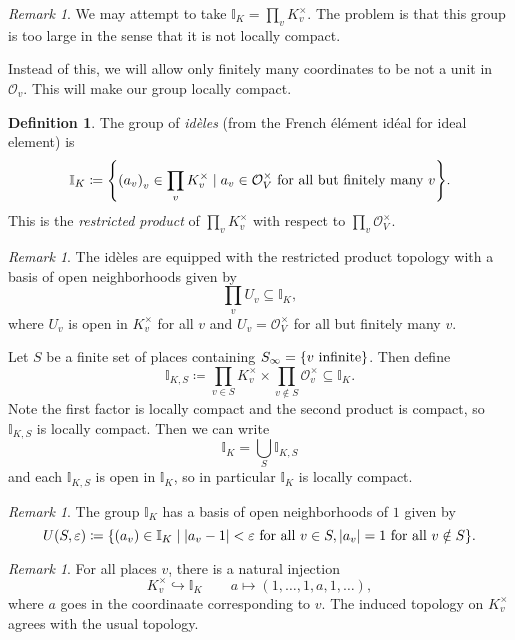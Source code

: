\documentclass[leqno, openany]{memoir}
\theoremstyle{definition}
\newtheorem{defn}[thm]{Definition}
\theoremstyle{remark}
\newtheorem{rmk}[thm]{Remark}
\theoremstyle{plain}
\theoremstyle{definition}
\theoremstyle{remark}
\newcommand{\I}{\mathbb{I}}
\newcommand{\ep}{\varepsilon}
\newcommand{\mc}[1]{\mathcal{#1}}
\begin{document}
\begin{rmk} We may attempt to take $\I_K = \prod_v K_v^{\times}$. The problem
is that this group is too large in the sense that it is not locally compact.
\end{rmk}

Instead of this, we will allow only finitely many coordinates to be not a unit
in $\mc{O}_v$. This will make our group locally compact.

\begin{defn} The group of \textit{id\`eles} (from the French \'el\'ement
    id\'eal for ideal element) is \[ \I_K \coloneqq \qty{{(a_v)}_v \in \prod_v
    K_v^{\times} \mid a_v \in \mc{O}_V^{\times} \text{ for all but finitely
    many }v}. \] This is the \textit{restricted product} of $\prod_v
    K_v^{\times}$ with respect to $\prod_v \mc{O}_V^{\times}$.  \end{defn}

\begin{rmk} The id\`eles are equipped with the restricted product topology with
    a basis of open neighborhoods given by \[ \prod_v U_v \subseteq \I_K, \]
    where $U_v$ is open in $K_v^{\times}$ for all $v$ and $U_v =
    \mc{O}_V^{\times}$ for all but finitely many $v$.  \end{rmk}

Let $S$ be a finite set of places containing $S_{\infty} = \qty{v\
\text{infinite}}$. Then define \[ \I_{K,S} \coloneqq \prod_{v \in S}
K_v^{\times} \times \prod_{v \notin S} \mc{O}_v^{\times} \subseteq \I_K. \]
Note the first factor is locally compact and the second product is compact, so
$\I_{K,S}$ is locally compact. Then we can write \[ \I_K = \bigcup_S \I_{K,S}
\] and each $\I_{K,S}$ is open in $\I_K$, so in particular $\I_K$ is locally
compact.

\begin{rmk} The group $\I_K$ has a basis of open neighborhoods of $1$ given by
    \[ U(S, \ep) \coloneqq \qty{(a_v) \in \I_K \mid \abs{a_v - 1} < \ep \text{
    for all } v \in S, \abs{a_v} = 1 \text{ for all } v \notin S}. \] \end{rmk}

\begin{rmk} For all places $v$, there is a natural injection \[ K_v^{\times}
\hookrightarrow \I_K \qquad a \mapsto (1, \ldots, 1, a, 1, \ldots), \] where
$a$ goes in the coordinaate corresponding to $v$. The induced topology on
$K_v^{\times}$ agrees with the usual topology.  \end{rmk}
\end{document}
